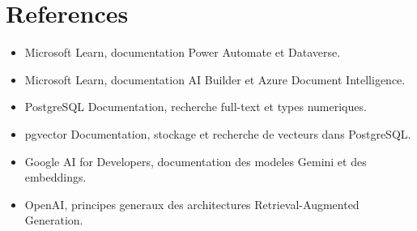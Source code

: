 \chapter*{References}
\label{chap:references}
%

\begin{itemize}
  \item Microsoft Learn, documentation Power Automate et Dataverse.
  \item Microsoft Learn, documentation AI Builder et Azure Document Intelligence.
  \item PostgreSQL Documentation, recherche full-text et types numeriques.
  \item pgvector Documentation, stockage et recherche de vecteurs dans PostgreSQL.
  \item Google AI for Developers, documentation des modeles Gemini et des embeddings.
  \item OpenAI, principes generaux des architectures Retrieval-Augmented Generation.
\end{itemize}
